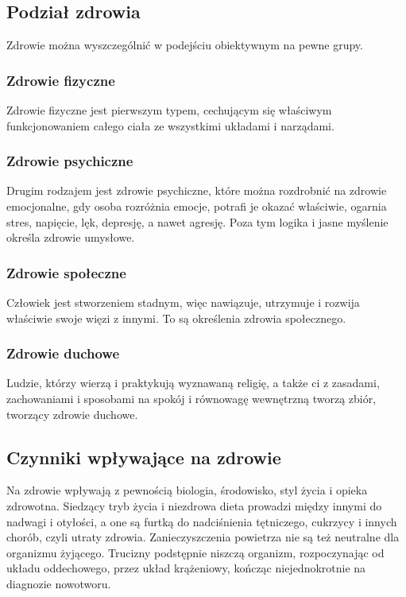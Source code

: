 \documentclass[11pt,a4paper]{article}
\begin{document}
\subsection{Podział zdrowia}
Zdrowie można wyszczególnić w podejściu obiektywnym na pewne grupy.

\subsubsection{Zdrowie fizyczne}
Zdrowie fizyczne jest pierwszym typem, cechującym się właściwym funkcjonowaniem całego ciała ze wszystkimi układami i narządami.

\subsubsection{Zdrowie psychiczne}
Drugim rodzajem jest zdrowie psychiczne, które można rozdrobnić na zdrowie emocjonalne, gdy osoba rozróżnia emocje, potrafi je okazać właściwie, ogarnia stres, napięcie, lęk, depresję, a nawet agresję. Poza tym logika i jasne myślenie określa zdrowie umysłowe.

\subsubsection{Zdrowie społeczne}
Człowiek jest stworzeniem stadnym, więc nawiązuje, utrzymuje i rozwija właściwie swoje więzi z innymi. To są określenia zdrowia społecznego.

\subsubsection{Zdrowie duchowe}
Ludzie, którzy wierzą i praktykują wyznawaną religię, a także ci z zasadami, zachowaniami i sposobami na spokój i równowagę wewnętrzną tworzą zbiór, tworzący zdrowie duchowe.

\subsection{Czynniki wpływające na zdrowie}
Na zdrowie wpływają z pewnością biologia, środowisko, styl życia i opieka zdrowotna. Siedzący tryb życia i niezdrowa dieta prowadzi między innymi do nadwagi i otyłości, a one są furtką do nadciśnienia tętniczego, cukrzycy i innych chorób, czyli utraty zdrowia. Zanieczyszczenia powietrza nie są też neutralne dla organizmu żyjącego. Trucizny podstępnie niszczą organizm, rozpoczynając od układu oddechowego, przez układ krążeniowy, kończąc niejednokrotnie na diagnozie nowotworu.
\end{document}
